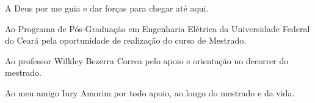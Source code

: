 A Deus por me guia e dar forças para chegar até aqui. 

Ao Programa de Pós-Graduação em Engenharia Elétrica da Universidade Federal do Ceará pela oportunidade de realização do curso de Mestrado.

Ao professor Wilkley Bezerra Correa pelo apoio e orientação no decorrer do mestrado.

Ao meu amigo Iury Amorim por todo apoio, ao longo do mestrado e da vida.
